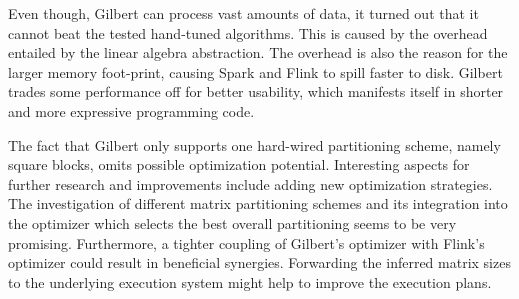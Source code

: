 Even though, Gilbert can process vast amounts of data, it turned out that it cannot beat the tested hand-tuned algorithms.
This is caused by the overhead entailed by the linear algebra abstraction. 
The overhead is also the reason for the larger memory foot-print, causing Spark and Flink to spill faster to disk.
Gilbert trades some performance off for better usability, which manifests itself in shorter and more expressive programming code. 

The fact that Gilbert only supports one hard-wired partitioning scheme, namely square blocks, omits possible optimization potential. 
Interesting aspects for further research and improvements include adding new optimization strategies. 
The investigation of different matrix partitioning schemes and its integration into the optimizer which selects the best overall partitioning seems to be very promising. 
Furthermore, a tighter coupling of Gilbert's optimizer with Flink's optimizer could result in beneficial synergies. 
Forwarding the inferred matrix sizes to the underlying execution system might help to improve the execution plans.